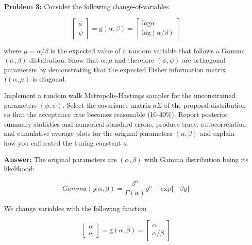 \documentclass[12pt]{article}
\begin{document}
\vspace{10mm}

\textbf{Problem 3:} Consider the following change-of-variables 

\begin{equation*}
\begin{bmatrix}
\phi \\ 
\psi
\end{bmatrix} = \text{g}(\alpha, \beta) = 
\begin{bmatrix} 
\text{log} \alpha \\
\text{log}(\alpha / \beta)
\end{bmatrix}
\end{equation*}

where $\mu = \alpha / \beta$ is the expected value of a random variable that follows a Gamma $(\alpha, \beta)$ distribution. Show that $\alpha, \mu$ and therefore $(\phi, \psi)$ are orthogonal parameters by demonstrating that the expected Fisher information matrix $I(\alpha, \mu)$ is diagonal.

Implement a random walk Metropolis-Hastings sampler for the unconstrained parameters $(\phi, \psi)$. Select the covariance matrix $a\Sigma$ of the proposal distribution so that the acceptance rate becomes reasonable (10-40\%). Report posterior summary statistics and numerical standard errors, produce trace, autocorrelation and cumulative average plots for the original parameters $(\alpha, \beta)$ and explain how you calibrated the tuning constant $a$.

\vspace{5mm}

\textbf{Answer:} The original parameters are $(\alpha,\beta)$ with Gamma distribution being its likelihood:

\begin{equation*}
Gamma(y|\alpha,\beta) = \frac{\beta^{\alpha}}{\Gamma(\alpha)}y^{\alpha-1}\text{exp}\{ -\beta y \}
\end{equation*}

We change variables with the following function 

\begin{equation}
\begin{bmatrix}
\alpha \\ 
\mu
\end{bmatrix} = \text{g}(\alpha, \beta) = 
\begin{bmatrix} 
\alpha \\
\alpha / \beta
\end{bmatrix}
\end{equation}
\end{document}
